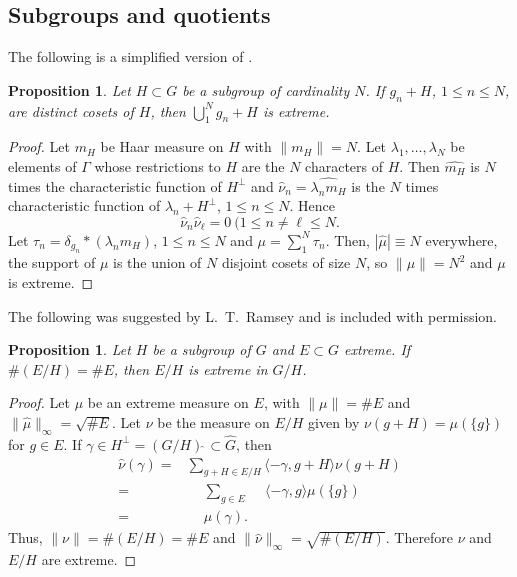 \documentclass[letter,11pt]{amsart}
\numberwithin{theorem}{section}
\newtheorem{prop}[theorem]{Proposition}
\theoremstyle{remark}
\numberwithin{equation}{section}
\begin{document}
\subsection{Subgroups and quotients}
The following is a simplified version of \cite[Theorem 2.1 (i)]{MR627683}\label{thmGR2.1}.
\begin{prop}\label{propUnionCosets}
Let $H\subset G$ be a subgroup of cardinality $N$. If $g_n+H$, $1\le n\le N$,
are distinct cosets of $H$, then $\bigcup _1^Ng_n+H$ is extreme.
\end{prop}


\begin{proof}
Let $m_H$ be Haar measure on $H$ with $\|m_H\|=N$. 
Let $\lambda_1,\dots,\lambda_N$ be
elements of $\Gamma$ whose restrictions to $H$ are the $N$ characters of $H$.
Then $\widehat{m_H}$ is $N$ times the characteristic function 
of $H^\perp$ and $\widehat\nu_n =\widehat{\lambda_nm_H}$ 
is the $N$ 
times characteristic function of
$\lambda_n+H^\perp$, $1\le n\le N$. Hence
\begin{equation}\label{eqZeroProducts}
\widehat \nu_n\widehat\nu_\ell =0 \ (1\le n\ne\ell\le  N.
\end{equation}
Let $\tau_n=
\delta_{g_n}*
(\lambda_n m_H)$,
 $1\le n\le N$ and $\mu = \sum_1^N\tau_n$.
 Then, 
$|\widehat\mu| \equiv N$ everywhere, the support of $\mu$ is  
the union of $N$ disjoint cosets of
 size $N$, so $\|\mu\|= N^2$ and $\mu$
 is extreme.
\end{proof}



The following was suggested by L.~T.~Ramsey and is included with permission.
 \begin{prop}%
 \label{propRamseyProjection}
 Let $H$ be a subgroup of $G$ and $E\subset G$ extreme. If $\#(E/H) =\#E$, then $E/H$ is extreme in $G/H$.
 \end{prop}
 
 \begin{proof}
 Let $\mu$ be an extreme measure on $E$, with $\|\mu\|=\#E$ and $\|\widehat\mu\|_\infty=\sqrt{\#E}$.
 Let $\nu$ be the measure on $E/H$ given by $\nu(g+H)=\mu(\{g\})$ for $g\in E$.
 If $\gamma\in H^\perp=(G/H)\widehat{\ }\subset \widehat G$, then 
 \begin{align*}
 \widehat\nu(\gamma) =
   &\sum_{g+H\in E/H} \langle-\gamma,g+H\rangle\nu(g+H)
   \\
   = &\ \quad\sum_{g\in E}\quad \ \langle-\gamma,g\rangle\mu(\{g\})
   \\
   = &\quad\ \widehat\mu(\gamma).
 \end{align*}
 Thus, $\|\nu\|=\#(E/H)=\#E$ and $\|\widehat\nu\|_\infty=\sqrt{\#(E/H)}.$ Therefore $\nu$ and $E/H$ are extreme.
 \end{proof}
 
\end{document}
